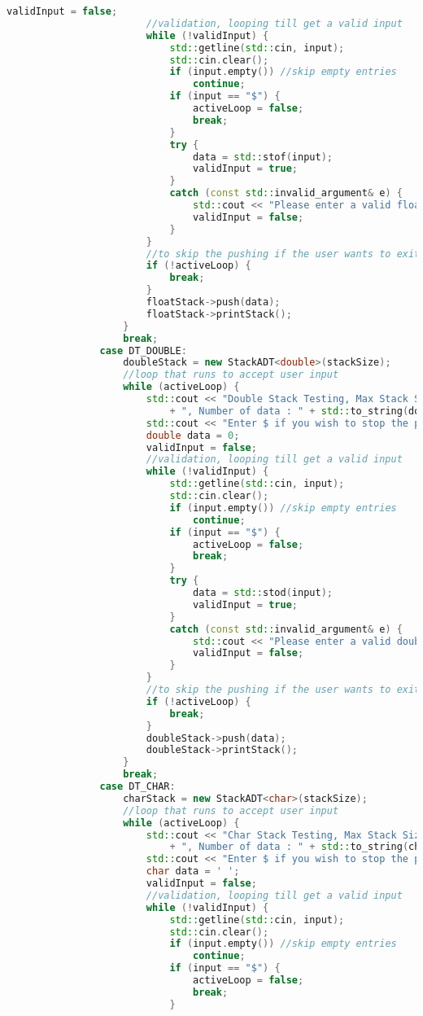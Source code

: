 \documentclass{report}
\begin{document}
\begin{lstlisting}[language=C++]
						validInput = false;
						//validation, looping till get a valid input
						while (!validInput) {
							std::getline(std::cin, input);
							std::cin.clear();
							if (input.empty()) //skip empty entries
								continue;
							if (input == "$") {
								activeLoop = false;
								break;
							}
							try {
								data = std::stof(input);
								validInput = true;
							}
							catch (const std::invalid_argument& e) {
								std::cout << "Please enter a valid float" << std::endl;
								validInput = false;
							}
						}
						//to skip the pushing if the user wants to exit
						if (!activeLoop) {
							break;
						}
						floatStack->push(data);
						floatStack->printStack();
					}
					break;
				case DT_DOUBLE:
					doubleStack = new StackADT<double>(stackSize);
					//loop that runs to accept user input
					while (activeLoop) {
						std::cout << "Double Stack Testing, Max Stack Size : " + std::to_string(stackSize)
							+ ", Number of data : " + std::to_string(doubleStack->getSize()) << std::endl;
						std::cout << "Enter $ if you wish to stop the process." << std::endl;
						double data = 0;
						validInput = false;
						//validation, looping till get a valid input
						while (!validInput) {
							std::getline(std::cin, input);
							std::cin.clear();
							if (input.empty()) //skip empty entries
								continue;
							if (input == "$") {
								activeLoop = false;
								break;
							}
							try {
								data = std::stod(input);
								validInput = true;
							}
							catch (const std::invalid_argument& e) {
								std::cout << "Please enter a valid double" << std::endl;
								validInput = false;
							}
						}
						//to skip the pushing if the user wants to exit
						if (!activeLoop) {
							break;
						}
						doubleStack->push(data);
						doubleStack->printStack();
					}
					break;
				case DT_CHAR:
					charStack = new StackADT<char>(stackSize);
					//loop that runs to accept user input
					while (activeLoop) {
						std::cout << "Char Stack Testing, Max Stack Size : " + std::to_string(stackSize)
							+ ", Number of data : " + std::to_string(charStack->getSize()) << std::endl;
						std::cout << "Enter $ if you wish to stop the process." << std::endl;
						char data = ' ';
						validInput = false;
						//validation, looping till get a valid input
						while (!validInput) {
							std::getline(std::cin, input);
							std::cin.clear();
							if (input.empty()) //skip empty entries
								continue;
							if (input == "$") {
								activeLoop = false;
								break;
							}

\end{lstlisting}
\end{document}
